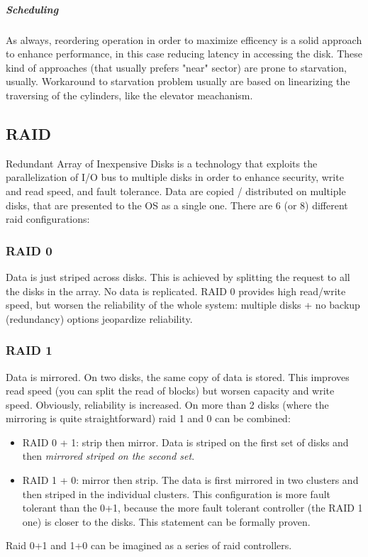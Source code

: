 \documentclass[10pt,a4paper]{article}
\begin{document}
						\subparagraph{Scheduling}
							As always, reordering operation in order to maximize efficency is a solid approach to enhance performance, in this case reducing latency in accessing the disk. These kind of approaches (that usually prefers "near" sector) are prone to starvation, usually. Workaround to starvation problem usually are based on linearizing the traversing of the cylinders, like the elevator meachanism.\\
			
			\subsection{RAID}
				Redundant Array of Inexpensive Disks is a technology that exploits the parallelization of I/O bus to multiple disks in order to enhance security, write and read speed, and fault tolerance. Data are copied / distributed on multiple disks, that are presented to the OS as a single one. There are 6 (or 8) different raid configurations:
				
				\subsubsection{RAID 0}
					Data is just striped across disks. This is achieved by splitting the request to all the disks in the array. No data is replicated. RAID 0 provides high read/write speed, but worsen the reliability of the whole system: multiple disks + no backup (redundancy) options jeopardize reliability.
					
				\subsubsection{RAID 1}
					Data is mirrored. On two disks, the same copy of data is stored. This improves read speed (you can split the read of blocks) but worsen capacity and write speed. Obviously, reliability is increased. On more than 2 disks (where the mirroring is quite straightforward) raid 1 and 0 can be combined:
					\begin{itemize}
						\item RAID 0 + 1: strip then mirror. Data is striped on the first set of disks and then \emph{mirrored striped on the second set}. 
						\item RAID 1 + 0: mirror then strip. The data is first mirrored in two clusters and then striped in the individual clusters. This configuration is more fault tolerant than the 0+1, because the more fault tolerant controller (the RAID 1 one) is closer to the disks. This statement can be formally proven. 
					\end{itemize}
					Raid 0+1 and 1+0 can be imagined as a series of raid controllers.
					
\end{document}
